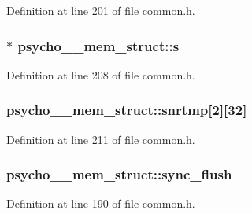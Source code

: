 Definition at line 201 of file common.\+h.

\subsubsection[{\texorpdfstring{s}{s}}]{$\ast$ psycho\+\_\+\_\+mem\+\_\+struct\+::s}\hypertarget{structpsycho__4__mem__struct_af40efc0e42b72a8e4d13485bce3dd689}{}\label{structpsycho__4__mem__struct_af40efc0e42b72a8e4d13485bce3dd689}


Definition at line 208 of file common.\+h.

\subsubsection[{\texorpdfstring{snrtmp}{snrtmp}}]{ psycho\+\_\+\_\+mem\+\_\+struct\+::snrtmp\mbox{[}2\mbox{]}\mbox{[}32\mbox{]}}\hypertarget{structpsycho__4__mem__struct_a13dea4787db56982acc3e64828304c75}{}\label{structpsycho__4__mem__struct_a13dea4787db56982acc3e64828304c75}


Definition at line 211 of file common.\+h.

\subsubsection[{\texorpdfstring{sync\+\_\+flush}{sync_flush}}]{ psycho\+\_\+\_\+mem\+\_\+struct\+::sync\+\_\+flush}\hypertarget{structpsycho__4__mem__struct_a30bc4054aa34b1a7159888e0e6739bc2}{}\label{structpsycho__4__mem__struct_a30bc4054aa34b1a7159888e0e6739bc2}


Definition at line 190 of file common.\+h.

